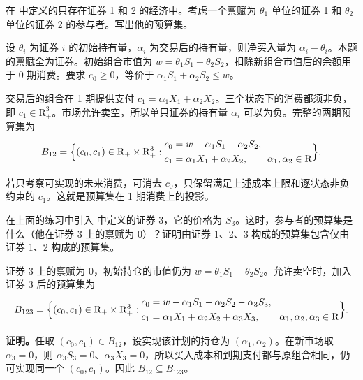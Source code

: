 \begin{problem}
 在 中定义的只存在证券 1 和 2 的经济中。考虑一个禀赋为 $\theta_{1}$ 单位的证券 1 和 $\theta_{2}$ 单位的证券 2 的参与者。写出他的预算集。
\end{problem}
\begin{solution}[blank-type=manual,blank-vsep=9\baselineskip]
设 $\theta_i$ 为证券 $i$ 的初始持有量，$\alpha_i$ 为交易后的持有量，则净买入量为 $\alpha_i-\theta_i$。本题的禀赋全为证券。初始组合市值为 $w=\theta_1S_1+\theta_2S_2$，扣除新组合市值后的余额用于 0 期消费。要求 $c_0\ge0$，等价于 $\alpha_1S_1+\alpha_2S_2\le w$。

交易后的组合在 1 期提供支付 $c_1=\alpha_1X_1+\alpha_2X_2$。三个状态下的消费都须非负，即 $c_1\in\mathrm{R}_+^3$。市场允许卖空，所以单只证券的持有量 $\alpha_i$ 可以为负。完整的两期预算集为
\[
    B_{12}=\Bigl\{(c_0,c_1)\in\mathrm{R}_{+}\times\mathrm{R}_{+}^{3}:
    \begin{aligned}
        c_0&=w-\alpha_1S_1-\alpha_2S_2,\\
        c_1&=\alpha_1X_1+\alpha_2X_2,\qquad \alpha_1,\alpha_2\in\mathrm{R}
    \end{aligned}
    \Bigr\}.
\]

若只考察可实现的未来消费，可消去 $c_0$，只保留满足上述成本上限和逐状态非负约束的 $c_1$。这就是预算集在 1 期消费上的投影。
\end{solution}

\begin{problem}
 在上面的练习中引入 中定义的证券 3，它的价格为 $S_{3}$。这时，参与者的预算集是什么（他在证券 3 上的禀赋为 0）？证明由证券 1、2、3 构成的预算集包含仅由证券 1、2 构成的预算集。
\end{problem}
\begin{solution}[blank-type=manual,blank-vsep=9\baselineskip]
证券 3 上的禀赋为 $0$，初始持仓的市值仍为 $w=\theta_1S_1+\theta_2S_2$。允许卖空时，加入证券 3 后的预算集为
\[
    B_{123}=\Bigl\{(c_0,c_1)\in\mathrm{R}_{+}\times\mathrm{R}_{+}^{3}:
    \begin{aligned}
        c_0&=w-\alpha_1S_1-\alpha_2S_2-\alpha_3S_3,\\
        c_1&=\alpha_1X_1+\alpha_2X_2+\alpha_3X_3,\qquad \alpha_1,\alpha_2,\alpha_3\in\mathrm{R}
    \end{aligned}
    \Bigr\}.
\]

\textbf{证明。}任取 $(c_0,c_1)\in B_{12}$，设实现该计划的持仓为 $(\alpha_1,\alpha_2)$。在新市场取 $\alpha_3=0$，则 $\alpha_3S_3=0$、$\alpha_3X_3=0$，所以买入成本和到期支付都与原组合相同，仍可实现同一个 $(c_0,c_1)$。因此 $B_{12}\subseteq B_{123}$。
\end{solution}

